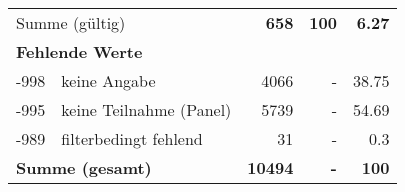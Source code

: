 \begin{longtable}{lXrrr}
     \midrule
     \multicolumn{2}{l}{Summe (gültig)} &
       \textbf{\num{658}} &
     \textbf{\num{100}} &
       \textbf{\num[round-mode=places,round-precision=2]{6.27}} \\
     \multicolumn{5}{l}{\textbf{Fehlende Werte}}\\
       -998 &
       keine Angabe &
         \num{4066} &
        - &
         \num[round-mode=places,round-precision=2]{38.75} \\
       -995 &
       keine Teilnahme (Panel) &
         \num{5739} &
        - &
         \num[round-mode=places,round-precision=2]{54.69} \\
       -989 &
       filterbedingt fehlend &
         \num{31} &
        - &
         \num[round-mode=places,round-precision=2]{0.3} \\
     \midrule
     \multicolumn{2}{l}{\textbf{Summe (gesamt)}} &
          \textbf{\num{10494}} &
        \textbf{-} &
        \textbf{\num{100}} \\
     \bottomrule
     \end{longtable}
     
